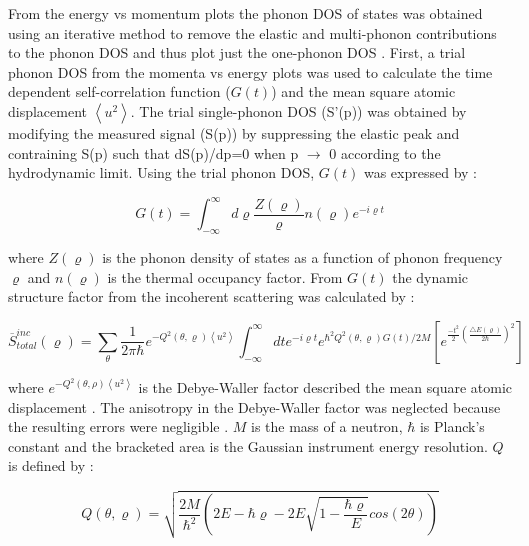 From the energy vs momentum plots the phonon DOS of states was obtained using an iterative method to remove the elastic and multi-phonon contributions to the phonon DOS and thus plot just the one-phonon DOS \cite{Fultz2009,Squires2012}. First, a trial phonon DOS from the momenta vs energy plots was used to calculate the time dependent self-correlation function ($G(t)$) and the mean square atomic displacement $\left< u^{2} \right>$. The trial single-phonon DOS (S'(p)) was obtained by modifying the measured signal (S(p)) by suppressing the elastic peak and contraining S(p) such that dS(p)/dp=0 when p $\rightarrow$ 0 according to the hydrodynamic limit. Using the trial phonon DOS, $G(t)$ was expressed by \cite{Manley2001,Manley2002}:

\begin{equation}
\label{eq: td_selfcorrelation}
G (t) = \int_{- \infty}^{\infty} d \varrho \frac{Z(\varrho)}{\varrho} n(\varrho) e^{- i \varrho t}
\end{equation}


\noindent where $Z(\varrho)$ is the phonon density of states as a function of phonon frequency $\varrho$ and $n(\varrho)$ is the thermal occupancy factor. From $G(t)$  the dynamic structure factor from the incoherent scattering was calculated by \cite{Manley2001,Manley2002}:

\begin{equation}
\label{eq: S_total_inc}
\overline{S}_{total}^{inc} (\varrho) = \sum_{\theta} \frac{1}{2 \pi \hbar} e^{- Q^{2} (\theta, \varrho) \left<u^{2} \right>} \int_{-\infty}^{\infty} dte^{-i \varrho t} e^{\hbar^{2}Q^{2}(\theta, \varrho) G(t)/2M} \left[ e^{\frac{-t^{2}}{2} \left(\frac{\bigtriangleup E (\varrho)}{2\hbar} \right)^{2}} \right]
\end{equation}

\noindent where $e^{-Q^{2}\left(\theta,\rho \right) \left< u^{2} \right>}$ is the Debye-Waller factor described the mean square atomic displacement \cite{Squires2012}. The anisotropy in the Debye-Waller factor was neglected because the resulting errors were negligible \cite{Manley2001}.  $M$ is the mass of a neutron, $\hbar$ is Planck's constant and the bracketed area is the Gaussian instrument energy resolution. $Q$ is defined by \cite{Manley2001,Manley2002}:

\begin{equation}
\label{eq: Q}
Q(\theta, \varrho) = \sqrt{\frac{2M}{\hbar^{2}} \left( 2E - \hbar \varrho - 2E \sqrt{1-\frac{\hbar \varrho}{E}}cos(2\theta) \right)}
\end{equation}

